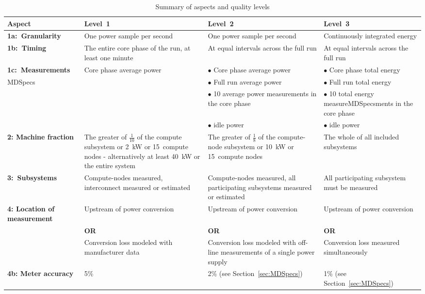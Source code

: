 \noindent
\begin{table}
\caption{Summary of aspects and quality levels}
\label{tab:levels}
\begin{tabular}{|p{3.0cm}|p{3.5cm}|p{3.5cm}|p{3.5cm}|} \hline
\textbf{Aspect}&\textbf{Level~1}&\textbf{Level~2}&\textbf{Level~3}\\ \hline

\textbf{1a:~Granularity} &
One power sample per second &
One power sample per second &
Continuously integrated energy\\
\hline


\textbf{1b:~Timing} &
The entire core phase of the run, at least one minute &
At equal intervals across the full run &
At equal intervals across the full run   \\
\hline

\textbf{1c:~Measurements} &
Core phase average power &
$\bullet$ Core phase average power & 
$\bullet$ Core phase total energy \\MDSpecs

 & &
$\bullet$ Full run average power &
$\bullet$ Full run total energy \\

 & &
$\bullet$ 10 average power measurements in the core phase &
$\bullet$ 10 total energy measureMDSpecsments in the core phase \\

 & &
$\bullet$ idle power &
$\bullet$ idle power \\
\hline

\textbf{2: Machine \newline fraction}  &
The greater of $\frac{1}{10}$ of the compute subsystem or 2~kW or 15~compute nodes - alternatively at least 40~kW or the entire system &
The greater of $\frac{1}{8}$ of the compute-node subsystem or 10~kW or 15~compute nodes &
The whole of all included subsystems \\
\hline

\textbf{3:~Subsystems} &
Compute-nodes measured, interconnect measured or estimated &
Compute-nodes measured, all participating subsystems measured or estimated &
All participating subsystem must be measured \\
\hline

\textbf{4: Location of measurement} &
Upstream of power conversion &
Upstream of power conversion &
Upstream of power conversion\\

 &
\centering \textbf{OR} &
\centering \textbf{OR} &
\centering \textbf{OR} \tabularnewline

 &
Conversion loss modeled with manufacturer data &
Conversion loss modeled with off-line measurements of a single power supply &
Conversion loss measured simultaneously \\
\hline
\textbf{4b: Meter accuracy} &
5\% &
2\% (see Section~\ref{sec:MDSpecs})&
1\% (see Section~\ref{sec:MDSpecs})\\
\hline
\end{tabular}
\end{table}

